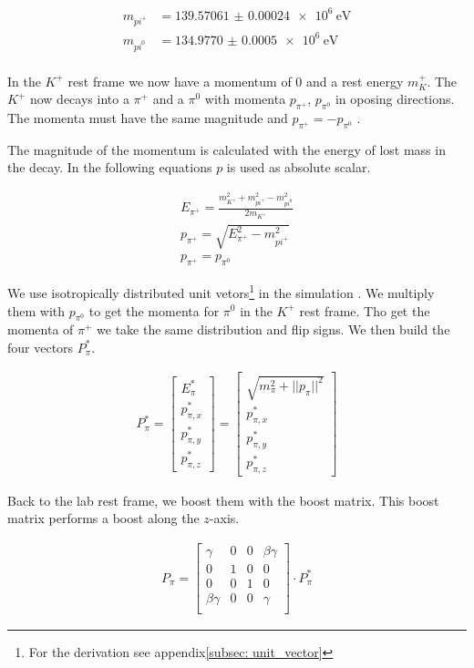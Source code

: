 \documentclass[12pt,a4paper,oneside,english]{article}
\begin{document}
	\begin{align*}
		m_{pi^+ } &=\SI{139.57061(24)e6}{\electronvolt}\\
		m_{pi^0 } &=\SI{134.9770(5)e6}{\electronvolt}\\
	\end{align*}
	
	In the $K^+$ rest frame we now have a momentum of $0$ and a rest energy $m_K^+$. The $K^+$ now decays into a $\pi^+$ and a $\pi^0$ with momenta $p_{\pi^+} $, $p_{\pi^0} $ in oposing directions. The momenta must have the same magnitude and $p_{\pi^+} = -p_{\pi^0} $ .
	
	The magnitude of the momentum is calculated with  the energy of lost mass in the decay. In the following equations $p$ is used as absolute scalar.
		
	\begin{align}
		E_{\pi^+} = \frac{m_{K^+}^2 + m_{pi^+ }^2 - m_{pi^0 }^2 } {2 m_{K^+}}\\
		p_{\pi^+} = \sqrt{E_{\pi^+}^2 - m_{pi^+ }^2 }\\
		p_{\pi^+ } = p_{\pi^0 }
	\end{align}

	
	We use isotropically distributed unit vetors\footnote{For the derivation see appendix\ref{subsec: unit_vector}} in the simulation . We multiply them with $p_{\pi^0}$ to get the momenta for $\pi^0$ in the $K^+$ rest frame. Tho get the momenta of $\pi^+$ we take the same distribution and flip signs. We then build the four vectors  $P^*_{\pi}$.
	
	\begin{align}
		 P^*_{\pi} = 
		\begin{bmatrix}
				E_{\pi}^* \\ p_{\pi,x}^* \\ p_{\pi,y}^* \\ p_{\pi,z}^*
		\end{bmatrix} = 
		\begin{bmatrix}
				\sqrt{m_{\pi}^2 + ||p_{\pi}||^2 } \\ p_{\pi,x}^* \\ p_{\pi,y}^* \\
				p_{\pi,z}^*
		\end{bmatrix}
	\end{align}
	
	Back to the lab rest frame, we boost them with the boost matrix. This boost matrix performs a boost along the $z$-axis. 
	
	\begin{align}
		P_{\pi} =
		\begin{bmatrix}
		\gamma & 0 & 0 & \beta \gamma \\
		0 & 1 & 0 & 0 \\
		0 & 0 & 1 & 0\\
		\beta \gamma & 0 & 0 & \gamma \\
		\end{bmatrix}
		\cdot
		P^*_{\pi}
	\end{align}
	
\end{document}

